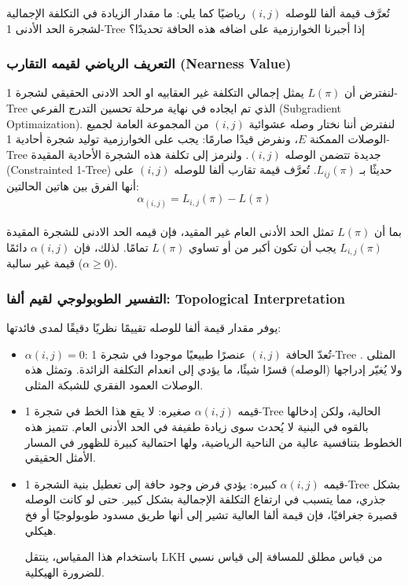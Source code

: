 \documentclass{article}
\newcommand{\en}[1]{\textenglish{#1}}
\begin{document}
تُعرَّف قيمة ألفا للوصله $(i,j)$ رياضيًا كما يلي: ما مقدار الزيادة في التكلفة الإجمالية لشجرة الحد الأدنى \en{1-Tree} إذا أجبرنا الخوارزمية على اضافه هذه الحافة تحديدًا؟\\

\subsubsection{التعريف الرياضي لقيمه التقارب (\en{Nearness Value})}
لنفترض أن $L(\pi)$ يمثل إجمالي التكلفة غير العقابيه او الحد الادنى الحقيقي لشجرة \en{1-Tree} الذي تم ايجاده في نهاية مرحلة تحسين التدرج الفرعي (\en{Subgradient Optimaization}). لنفترض أننا نختار وصله عشوائية $(i,j)$ من المجموعة العامة لجميع الوصلات الممكنة $E$، ونفرض قيدًا صارمًا: يجب على الخوارزمية توليد شجرة أحادية \en{1-Tree} جديدة تتضمن الوصله $(i,j)$. ولنرمز إلى تكلفة هذه الشجرة الأحادية المقيدة (\en{Constrainted 1-Tree}) حديثًا بـ $L_{ij} (\pi)$. تُعرَّف قيمة تقارب ألفا للوصله $(i,j)$ على أنها الفرق بين هاتين الحالتين:\\

{\LARGE$$
\alpha_{(i,j)} = L_{i,j}(\pi) - L(\pi)
$$}\\

بما أن $L(\pi)$ تمثل الحد الأدنى العام غير المقيد، فإن قيمه الحد الادنى للشجرة المقيدة $L_{i,j}(\pi)$ يجب أن تكون أكبر من أو تساوي $L(\pi)$ تمامًا. لذلك، فإن $\alpha(i,j)$ دائمًا قيمة غير سالبة ($\alpha \ge 0$).

\subsubsection{التفسير الطوبولوجي لقيم ألفا: \en{Topological Interpretation}}
يوفر مقدار قيمة ألفا للوصله تقييمًا نظريًا دقيقًا لمدى فائدتها:\\

\begin{itemize}
\item $\alpha(i,j) = 0$:
تُعدّ الحافة $(i,j)$ عنصرًا طبيعيًا موجودا في شجرة \en{1-Tree} المثلى . ولا يُغيّر إدراجها (الوصله) قسرًا شيئًا، ما يؤدي إلى انعدام التكلفة الزائدة. وتمثل هذه الوصلات العمود الفقري للشبكة المثلى.

\item قيمه $\alpha(i,j)$ صغيره:
لا يقع هذا الخط في شجرة \en{1-Tree} الحالية، ولكن إدخالها بالقوه في البنية لا يُحدث سوى زيادة طفيفة في الحد الأدنى العام. تتميز هذه الخطوط بتنافسية عالية من الناحية الرياضية، ولها احتمالية كبيرة للظهور في المسار الأمثل الحقيقي.

\item قيمه $\alpha(i,j)$ كبيره:
يؤدي فرض وجود حافة إلى تعطيل بنية الشجرة \en{1-Tree} بشكل جذري، مما يتسبب في ارتفاع التكلفة الإجمالية بشكل كبير. حتى لو كانت الوصله قصيرة جغرافيًا، فإن قيمة ألفا العالية تشير إلى أنها طريق مسدود طوبولوجيًا أو فخ هيكلي.

باستخدام هذا المقياس، ينتقل LKH من قياس مطلق للمسافة إلى قياس نسبي للضرورة الهيكلية.
\end{itemize}
\end{document}
